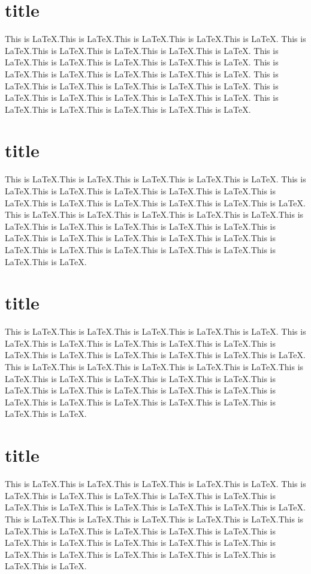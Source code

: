 \documentclass{article}
\begin{document}
\pagestyle{empty}

\section{title}
This is LaTeX.This is LaTeX.This is LaTeX.This is LaTeX.This is LaTeX.
This is LaTeX.This is LaTeX.This is LaTeX.This is LaTeX.This is LaTeX.
This is LaTeX.This is LaTeX.This is LaTeX.This is LaTeX.This is LaTeX.
This is LaTeX.This is LaTeX.This is LaTeX.This is LaTeX.This is LaTeX.
This is LaTeX.This is LaTeX.This is LaTeX.This is LaTeX.This is LaTeX.
This is LaTeX.This is LaTeX.This is LaTeX.This is LaTeX.This is LaTeX.
This is LaTeX.This is LaTeX.This is LaTeX.This is LaTeX.This is LaTeX.

\section{title}
This is LaTeX.This is LaTeX.This is LaTeX.This is LaTeX.This is LaTeX.
This is LaTeX.This is LaTeX.This is LaTeX.This is LaTeX.This is LaTeX.This is LaTeX.This is LaTeX.This is LaTeX.This is LaTeX.This is LaTeX.This is LaTeX.
This is LaTeX.This is LaTeX.This is LaTeX.This is LaTeX.This is LaTeX.This is LaTeX.This is LaTeX.This is LaTeX.This is LaTeX.This is LaTeX.This is LaTeX.This is LaTeX.This is LaTeX.This is LaTeX.This is LaTeX.This is LaTeX.This is LaTeX.This is LaTeX.This is LaTeX.This is LaTeX.This is LaTeX.This is LaTeX.

\section{title}
This is LaTeX.This is LaTeX.This is LaTeX.This is LaTeX.This is LaTeX.
This is LaTeX.This is LaTeX.This is LaTeX.This is LaTeX.This is LaTeX.This is LaTeX.This is LaTeX.This is LaTeX.This is LaTeX.This is LaTeX.This is LaTeX.
This is LaTeX.This is LaTeX.This is LaTeX.This is LaTeX.This is LaTeX.This is LaTeX.This is LaTeX.This is LaTeX.This is LaTeX.This is LaTeX.This is LaTeX.This is LaTeX.This is LaTeX.This is LaTeX.This is LaTeX.This is LaTeX.This is LaTeX.This is LaTeX.This is LaTeX.This is LaTeX.This is LaTeX.This is LaTeX.

\section{title}
This is LaTeX.This is LaTeX.This is LaTeX.This is LaTeX.This is LaTeX.
This is LaTeX.This is LaTeX.This is LaTeX.This is LaTeX.This is LaTeX.This is LaTeX.This is LaTeX.This is LaTeX.This is LaTeX.This is LaTeX.This is LaTeX.
This is LaTeX.This is LaTeX.This is LaTeX.This is LaTeX.This is LaTeX.This is LaTeX.This is LaTeX.This is LaTeX.This is LaTeX.This is LaTeX.This is LaTeX.This is LaTeX.This is LaTeX.This is LaTeX.This is LaTeX.This is LaTeX.This is LaTeX.This is LaTeX.This is LaTeX.This is LaTeX.This is LaTeX.This is LaTeX.
\end{document}
